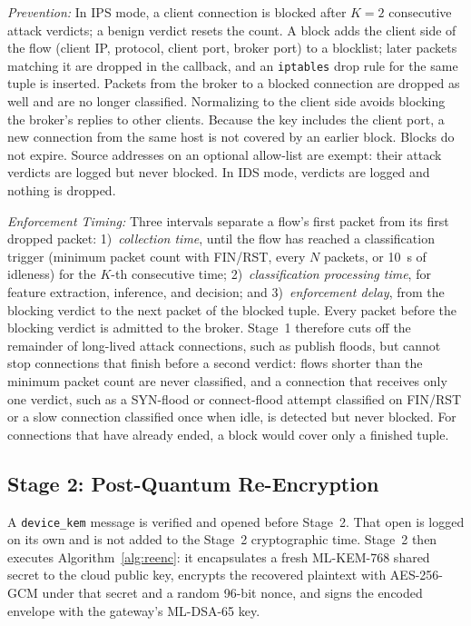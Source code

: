 \documentclass[journal]{IEEEtran}
\begin{document}
\textit{Prevention:} In IPS mode, a client connection is blocked after $K = 2$ consecutive attack verdicts; a benign verdict resets the count. A block adds the client side of the flow (client IP, protocol, client port, broker port) to a blocklist; later packets matching it are dropped in the callback, and an \texttt{iptables} drop rule for the same tuple is inserted. Packets from the broker to a blocked connection are dropped as well and are no longer classified. Normalizing to the client side avoids blocking the broker's replies to other clients. Because the key includes the client port, a new connection from the same host is not covered by an earlier block. Blocks do not expire. Source addresses on an optional allow-list are exempt: their attack verdicts are logged but never blocked. In IDS mode, verdicts are logged and nothing is dropped.

\textit{Enforcement Timing:} Three intervals separate a flow's first packet from its first dropped packet: 1)~\emph{collection time}, until the flow has reached a classification trigger (minimum packet count with FIN/RST, every $N$ packets, or 10~s of idleness) for the $K$-th consecutive time; 2)~\emph{classification processing time}, for feature extraction, inference, and decision; and 3)~\emph{enforcement delay}, from the blocking verdict to the next packet of the blocked tuple. Every packet before the blocking verdict is admitted to the broker. Stage~1 therefore cuts off the remainder of long-lived attack connections, such as publish floods, but cannot stop connections that finish before a second verdict: flows shorter than the minimum packet count are never classified, and a connection that receives only one verdict, such as a SYN-flood or connect-flood attempt classified on FIN/RST or a slow connection classified once when idle, is detected but never blocked. For connections that have already ended, a block would cover only a finished tuple.

\subsection{Stage 2: Post-Quantum Re-Encryption}
\label{sec:stage2}

A \texttt{device\_kem} message is verified and opened before Stage~2. That open is logged on its own and is not added to the Stage~2 cryptographic time. Stage~2 then executes Algorithm~\ref{alg:reenc}: it encapsulates a fresh ML-KEM-768 shared secret to the cloud public key, encrypts the recovered plaintext with AES-256-GCM under that secret and a random 96-bit nonce, and signs the encoded envelope with the gateway's ML-DSA-65 key.
\end{document}
